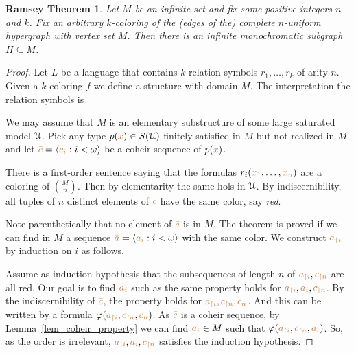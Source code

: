 \documentclass[creche.tex]{subfiles}
\begin{document}
\theoremstyle{mio}
\newtheorem{Ramsey}[thm]{Ramsey Theorem}
\begin{Ramsey}\label{thm_Ramsey}
Let $M$ be an infinite set and fix some positive integers $n$ and $k$.
Fix an arbitrary $k$-coloring of the (edges of the) complete $n$-uniform hypergraph with vertex set $M$.
Then there is an infinite monochromatic subgraph $H\subseteq M$.
\end{Ramsey}
\begin{proof}
Let $L$ be a language that contains $k$ relation symbols $r_1,\dots,r_k$ of arity $n$.
Given a $k$-coloring $f$ we define a structure with domain $M$.
The interpretation the relation symbols is




We may assume that $M$ is an elementary substructure of some large saturated model $\EuScript U$.
Pick any type $p({\color{brown} x})\in S(\EuScript U)$ finitely satisfied in $M$ but not realized in $M$ and let ${\color{brown}\bar c}=\langle{\color{brown}c_i}:i<\omega\rangle$ be a coheir sequence of $p({\color{brown} x})$.

There is a first-order sentence saying that the formulas $r_i({\color{brown} x_1},\dots,{\color{brown} x_n})$ are a coloring of ${M\choose n}$.
Then by elementarity the same hols in $\EuScript U$.
By indiscernibility,
all tuples of $n$ distinct elements of ${\color{brown}\bar c}$ have the same color, say \textit{red}.


Note parenthetically that no element of ${\color{brown}\bar c}$ is in $M$.
The theorem is proved if we can find in $M$ a sequence ${\color{brown}\bar a}=\langle{\color{brown}a_i}:i<\omega\rangle$ with the same color.
We construct ${\color{brown} a_{\restriction i}}$ by induction on $i$ as follows.

Assume as induction hypothesis that the subsequences of length $n$ of ${\color{brown} a_{\restriction i}},{\color{brown} c_{\restriction n}}$ are all red.
Our goal is to find ${\color{brown} a_i}$ such as the same property holds for ${\color{brown} a_{\restriction i}},{\color{brown} a_i},{\color{brown} c_{\restriction n}}$.
By the indiscernibility of ${\color{brown}\bar c}$,
the property holds for  ${\color{brown} a_{\restriction i}},{\color{brown} c_{\restriction n}},{\color{brown}{c_n}}$.
And this can be written by a formula $\varphi({\color{brown} a_{\restriction i}},{\color{brown} c_{\restriction n}},{\color{brown}{c_n}})$.
As ${\color{brown}\bar c}$ is a coheir sequence,
by Lemma~\ref{lem_coheir_property} we can find  ${\color{brown} a_i}\in M$ such that  $\varphi({\color{brown} a_{\restriction i}},{\color{brown} c_{\restriction n}},{\color{brown} a_i})$.
So,
as the order is irrelevant,
${\color{brown} a_{\restriction i}},{\color{brown} a_i},{\color{brown} c_{\restriction n}}$ satisfies the induction hypothesis.
\end{proof}
\end{document}
